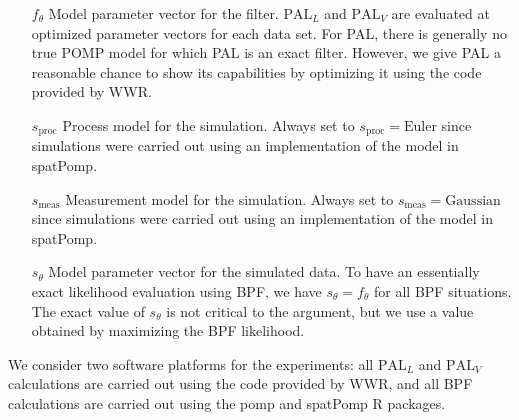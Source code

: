 \documentclass{article}
\newcommand\sproc{s_{\mathrm{proc}}}
\newcommand\smeas{s_{\mathrm{meas}}}
\newcommand\sprocEuler{\mathrm{Euler}}
\newcommand\smeasGaussian{\mathrm{Gaussian}}
\newcommand\PALL{$\mathrm{PAL}_L$} %
\newcommand\PALV{$\mathrm{PAL}_V$} %
\begin{document}
\begin{itemize}
\item[$f_{\theta}$] Model parameter vector for the filter. 
{\PALL} and {\PALV} are evaluated at optimized parameter vectors for each data set. 
For PAL, there is generally no true POMP model for which PAL is an exact filter.
However, we give PAL a reasonable chance to show its capabilities by optimizing it using the code provided by WWR. 

\item[$\sproc$] Process model for the simulation. 
Always set to $\sproc=\sprocEuler$ since simulations were carried out using an implementation of the model in spatPomp. 

\item[$\smeas$] Measurement model for the simulation. 
Always set to $\smeas=\smeasGaussian$ since simulations were carried out using an implementation of the model in spatPomp. 



\item[$s_{\theta}$] Model parameter vector for the simulated data.
To have an essentially exact likelihood evaluation using BPF, we have $s_\theta=f_\theta$ for all BPF situations. 
The exact value of $s_\theta$ is not critical to the argument, but we use a value obtained by maximizing the BPF likelihood.

\end{itemize}

We consider two software platforms for the experiments: all {\PALL} and {\PALV} calculations are carried out using the code provided by WWR, and all BPF calculations are carried out using the pomp \citep{king16} and spatPomp R packages.
\end{document}
